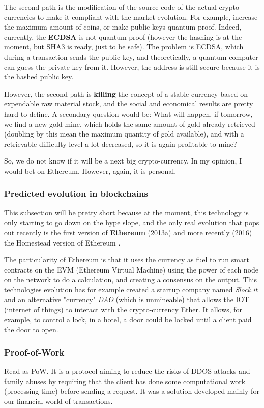 The second path is the modification of the source code of the actual crypto-currencies to make it compliant with the market evolution. For example, increase the maximum amount of coins, or make public keys quantum proof. Indeed, currently, the \textbf{ECDSA} is not quantum proof (however the hashing is at the moment, but SHA3 is ready, just to be safe). The problem is ECDSA, which during a transaction sends the public key, and theoretically, a quantum computer can guess the private key from it. However, the address is still secure because it is the hashed public key.

However, the second path is \textbf{killing} the concept of a stable currency based on expendable raw material stock, and the social and economical results are pretty hard to define. A secondary question would be: What will happen, if tomorrow, we find a new gold mine, which holds the same amount of gold already retrieved (doubling by this mean the maximum quantity of gold available), and with a retrievable difficulty level a lot decreased, so it is again profitable to mine?

So, we do not know if it will be a next big crypto-currency. In my opinion, I would bet on Ethereum. However, again, it is personal.

\subsubsection{Predicted evolution in blockchains}
This subsection will be pretty short because at the moment, this technology is only starting to go down on the hype slope, and the only real evolution that pops out recently is the first version of  \textbf{Ethereum}\cite{VitalikButerin2013APlatform} (2013a) and more recently (2016) the Homestead version of Ethereum \cite{DR.GAVINWOOD2015ETHEREUM:DRAFT}.

The particularity of Ethereum is that it uses the currency as fuel to run smart contracts on the EVM (Ethereum Virtual Machine) using the power of each node on the network to do a calculation, and creating a consensus on the output. This technologies evolution has for example created a startup company named \textit{Slock.it} and an alternative "currency" \textit{DAO} (which is unmineable) that allows the IOT (internet of things) to interact with the crypto-currency Ether. It allows, for example, to control a lock, in a hotel, a door could be locked until a client paid the door to open.

\subsubsection{Proof-of-Work}
Read as PoW\cite{Dwork1993PricingMail, Jakobsson1999ProofsAbstract}. It is a protocol aiming to reduce the risks of DDOS attacks and family abuses by requiring that the client has done some computational work (processing time) before sending a request. It was a solution developed mainly for our financial world of transactions.

